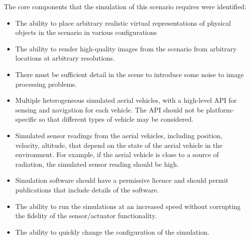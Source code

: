 The core components that the simulation of this scenario requires were identified: 
\begin{itemize}
    \item The ability to place arbitrary realistic virtual representations of physical objects in the scenario in various configurations
    \item The ability to render high-quality images from the scenario from arbitrary locations at arbitrary resolutions.
    \item There must be sufficient detail in the scene to introduce some noise to image processing problems.
    \item Multiple heterogeneous simulated aerial vehicles, with a high-level API for sensing and navigation for each vehicle. The API should not be platform-specific so that different types of vehicle may be considered.
    \item Simulated sensor readings from the aerial vehicles, including position, velocity, altitude, that depend on the state of the aerial vehicle in the environment. For example, if the aerial vehicle is close to a source of radiation, the simulated sensor reading should be high.
    \item Simulation software should have a permissive licence and should permit publications that include details of the software.
    \item The ability to run the simulations at an increased speed without corrupting the fidelity of the sensor/actuator functionality.
    \item The ability to quickly change the configuration of the simulation.
\end{itemize}

